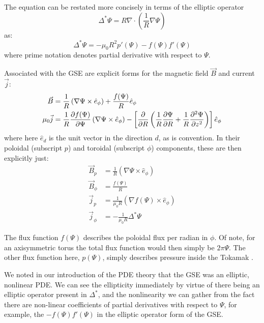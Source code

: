 \begin{remark}
    The equation can be restated more concisely in terms of the elliptic operator
    $$\Delta^{*} \Psi = R \nabla \cdot \left ( \frac{1}{R} \nabla \Psi \right )$$
    as:
    \begin{equation*}
        \Delta^{*} \Psi = -\mu_0 R^2 p'(\Psi) - f(\Psi) f'(\Psi)
    \end{equation*}
    where prime notation denotes partial derivative with respect to $\Psi$.
\end{remark}

\begin{corollary}
    Associated with the GSE are explicit forms for the magnetic field $\vec{B}$ and current $\vec{j}$:
    \begin{align}
        \vec{B} &= \frac{1}{R} \left ( \nabla \Psi \times \hat{e}_{\phi} \right ) + \frac{f(\Psi)}{R} \hat{e}_{\phi} \\
        \mu_0 \vec{j}   &= \frac{1}{R} \pdv{f(\Psi)}{\Psi} \left ( \nabla \Psi \times \hat{e}_{\phi} \right ) - \left [ \pdv{}{R} \left ( \frac{1}{R} \pdv{\Psi}{R} + \frac{1}{R} \pdv[2]{\Psi}{z}\right ) \right ] \hat{e}_{\phi}
    \end{align}
    where here $\hat{e}_{d}$ is the unit vector in the direction $d$, as is convention. In their poloidal (subscript $p$) and toroidal (subscript $\phi$) components, these are then explicitly just:
    \begin{align*}
        \vec{B}_p &= \frac{1}{R} \left ( \nabla \Psi \times \hat{e}_{\phi} \right ) \\
        \vec{B}_{\phi} &= \frac{f(\Psi)}{R} \\
        \vec{j}_p &= \frac{1}{\mu_0 R} \left ( \nabla f(\Psi) \times \hat{e}_{\phi}\right )\\
        \vec{j}_{\phi} &= -\frac{1}{\mu_0 R} \Delta^{*} \Psi
    \end{align*}
\end{corollary}

\begin{remark}
    The flux function $f(\Psi)$ describes the poloidal flux per radian in $\phi$. Of note, for an axisymmetric torus the 
    total flux function would then simply be $2\pi \Psi$. The other flux function here, $p(\Psi)$, simply describes pressure 
    inside the Tokamak \cite{gse-derivation}. 
\end{remark}

\begin{remark}
    We noted in our introduction of the PDE theory that the GSE was an elliptic, nonlinear PDE. We can see the 
    ellipticity immediately by virtue of there being an elliptic operator present in $\Delta^{*}$, and the nonlinearity 
    we can gather from the fact there are non-linear coefficients of partial derivatives with respect to $\Psi$, for example, the  
    $-f(\Psi)f'(\Psi)$ in the elliptic operator form of the GSE.
\end{remark}

